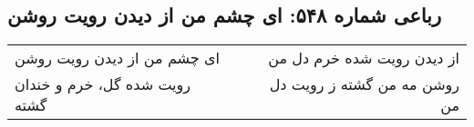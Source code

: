 \begin{center}
\section*{رباعی شماره ۵۴۸: ای چشم من از دیدن رویت روشن}
\label{sec:sh548}
\begin{longtable}{l p{0.5cm} r}
ای چشم من از دیدن رویت روشن
&&
از دیدن رویت شده خرم دل من
\\
رویت شده گل، خرم و خندان گشته
&&
روشن مه من گشته ز رویت دل من
\\
\end{longtable}
\end{center}
